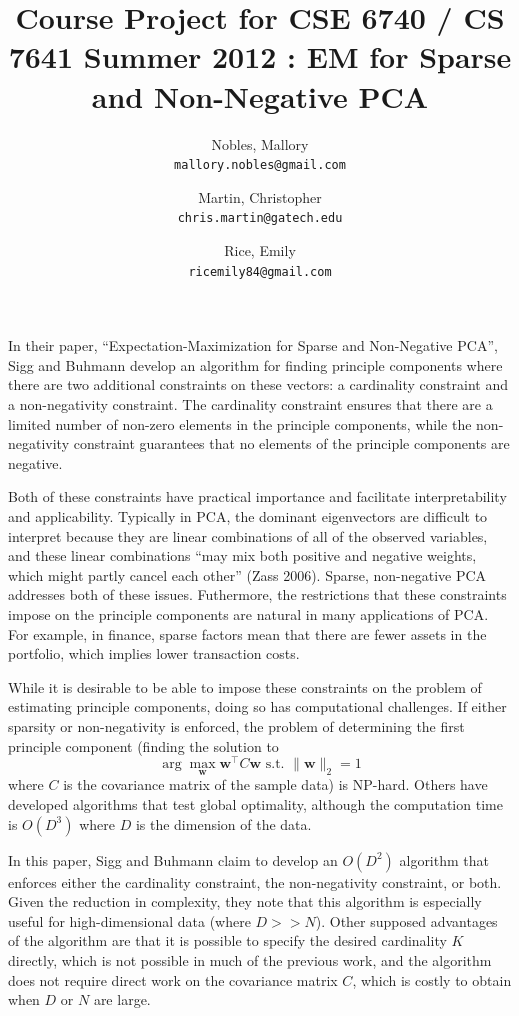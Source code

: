 \documentclass{article}
\title{Course Project for CSE 6740 / CS 7641 Summer 2012
  : EM for Sparse and Non-Negative PCA}
\author{Nobles, Mallory \\ \texttt{mallory.nobles@gmail.com}
  \and Martin, Christopher \\ \texttt{chris.martin@gatech.edu}
  \and Rice, Emily \\ \texttt{ricemily84@gmail.com} }
\date{}
\begin{document}
\maketitle

In their paper, ``Expectation-Maximization for Sparse and Non-Negative PCA'',
Sigg and Buhmann develop an algorithm for finding principle components where
there are two additional constraints on these vectors:
a cardinality constraint and a non-negativity constraint.
The cardinality constraint ensures that there are a limited number
of non-zero elements in the principle components, while
the non-negativity constraint guarantees that no elements of
the principle components are negative.

Both of these constraints have practical importance and facilitate
interpretability and applicability.
Typically in PCA, the dominant eigenvectors are difficult to interpret
because they are linear combinations of all of the observed variables,
and these linear combinations ``may mix both positive and negative weights,
which might partly cancel each other'' (Zass 2006).
Sparse, non-negative PCA addresses both of these issues.
Futhermore, the restrictions that these constraints impose on the
principle components are natural in many applications of PCA.
For example, in finance, sparse factors mean that there are
fewer assets in the portfolio, which implies lower transaction costs.

While it is desirable to be able to impose these constraints on
the problem of estimating principle components, doing so has
computational challenges. If either sparsity or non-negativity
is enforced, the problem of determining the first principle component
(finding the solution to \[
\arg\max_{\mathbf{w}} \mathbf{w}^\intercal C\mathbf{w}
\textrm{ s.t. } \|\mathbf{w}\|_2 = 1
\]
where $C$ is the covariance matrix of the sample data) is NP-hard.
Others have developed algorithms that test global optimality, although
the computation time is $O(D^3)$ where $D$ is the dimension of the data.

In this paper, Sigg and Buhmann claim to develop an $O(D^2)$ algorithm
that enforces either the cardinality constraint,
the non-negativity constraint, or both.
Given the reduction in complexity, they note that this algorithm is
especially useful for high-dimensional data (where $D >> N$).
Other supposed advantages of the algorithm are that it is possible
to specify the desired cardinality $K$ directly, which is not possible
in much of the previous work, and the algorithm does not require
direct work on the covariance matrix $C$, which is costly to obtain
when $D$ or $N$ are large.
\end{document}
